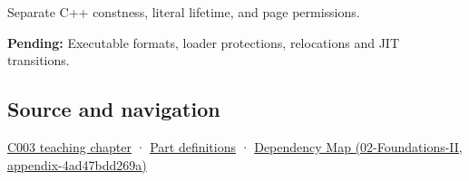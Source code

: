 Separate C++ constness, literal lifetime, and page permissions.

\textbf{Pending:} Executable formats, loader protections, relocations and JIT transitions.

\subsection{Source and navigation}\label{appendix-5f9e5e2f0a5e-source-and-navigation}

\hyperref[01-foundations-i-ch002-where-the-bytes-live]{C003 teaching chapter} · \hyperref[appendix-fd090d982a15-m003---parts-41-60]{Part definitions} · \href{../02-Foundations-II/main.pdf\#nameddest=appendix-4ad47bdd269a}{Dependency Map (02-Foundations-II, appendix-4ad47bdd269a)}
